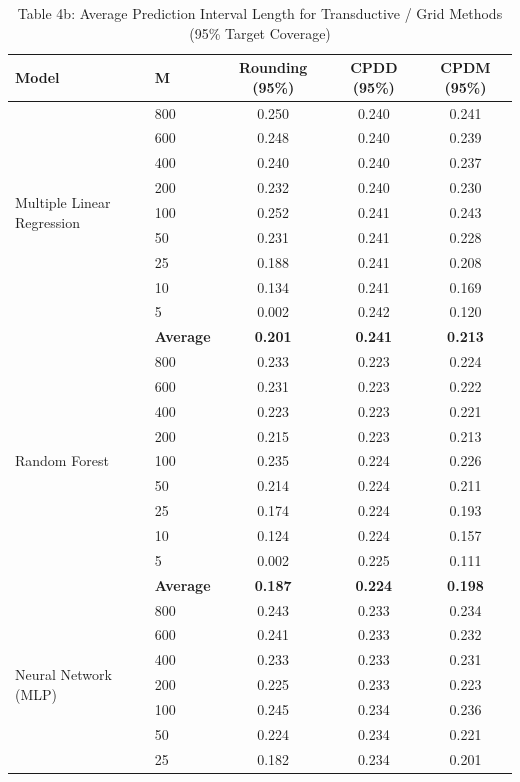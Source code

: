 \documentclass[11pt,a4paper]{article}
\begin{document}
\begin{table}[H]
\centering
\caption{Table 4b: Average Prediction Interval Length for Transductive / Grid Methods (95\% Target Coverage)}
\label{tab:mvp_tab4b}
\scriptsize
\begin{tabular}{llccc}
\toprule
Model & M & Rounding (95\%) & CPDD (95\%) & CPDM (95\%) \\
\midrule
\multirow{9}{*}{Multiple Linear Regression}
 & 800 & 0.250 & 0.240 & 0.241 \\
 & 600 & 0.248 & 0.240 & 0.239 \\
 & 400 & 0.240 & 0.240 & 0.237 \\
 & 200 & 0.232 & 0.240 & 0.230 \\
 & 100 & 0.252 & 0.241 & 0.243 \\
 & 50  & 0.231 & 0.241 & 0.228 \\
 & 25  & 0.188 & 0.241 & 0.208 \\
 & 10  & 0.134 & 0.241 & 0.169 \\
 & 5   & 0.002 & 0.242 & 0.120 \\
 & \textbf{Average} & \textbf{0.201} & \textbf{0.241} & \textbf{0.213} \\
\midrule
\multirow{9}{*}{Random Forest}
 & 800 & 0.233 & 0.223 & 0.224 \\
 & 600 & 0.231 & 0.223 & 0.222 \\
 & 400 & 0.223 & 0.223 & 0.221 \\
 & 200 & 0.215 & 0.223 & 0.213 \\
 & 100 & 0.235 & 0.224 & 0.226 \\
 & 50  & 0.214 & 0.224 & 0.211 \\
 & 25  & 0.174 & 0.224 & 0.193 \\
 & 10  & 0.124 & 0.224 & 0.157 \\
 & 5   & 0.002 & 0.225 & 0.111 \\
 & \textbf{Average} & \textbf{0.187} & \textbf{0.224} & \textbf{0.198} \\
\midrule
\multirow{9}{*}{Neural Network (MLP)}
 & 800 & 0.243 & 0.233 & 0.234 \\
 & 600 & 0.241 & 0.233 & 0.232 \\
 & 400 & 0.233 & 0.233 & 0.231 \\
 & 200 & 0.225 & 0.233 & 0.223 \\
 & 100 & 0.245 & 0.234 & 0.236 \\
 & 50  & 0.224 & 0.234 & 0.221 \\
 & 25  & 0.182 & 0.234 & 0.201 \\

\end{tabular}
\end{table}
\end{document}
